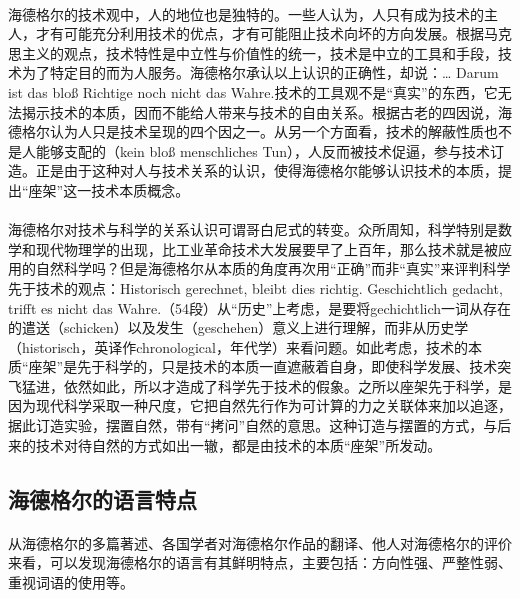 \documentclass{article}
\begin{document}
		\paragraph{}
海德格尔的技术观中，人的地位也是独特的。一些人认为，人只有成为技术的主人，才有可能充分利用技术的优点，才有可能阻止技术向坏的方向发展。根据马克思主义的观点，技术特性是中立性与价值性的统一，技术是中立的工具和手段，技术为了特定目的而为人服务。海德格尔承认以上认识的正确性，却说：… Darum ist das bloß Richtige noch nicht das Wahre.技术的工具观不是“真实”的东西，它无法揭示技术的本质，因而不能给人带来与技术的自由关系。根据古老的四因说，海德格尔认为人只是技术呈现的四个因之一。从另一个方面看，技术的解蔽性质也不是人能够支配的（kein bloß menschliches Tun），人反而被技术促逼，参与技术订造。正是由于这种对人与技术关系的认识，使得海德格尔能够认识技术的本质，提出“座架”这一技术本质概念。
		\paragraph{}
海德格尔对技术与科学的关系认识可谓哥白尼式的转变。众所周知，科学特别是数学和现代物理学的出现，比工业革命技术大发展要早了上百年，那么技术就是被应用的自然科学吗？但是海德格尔从本质的角度再次用“正确”而非“真实”来评判科学先于技术的观点：Historisch gerechnet, bleibt dies richtig. Geschichtlich gedacht, trifft es nicht das Wahre.（54段）从“历史”上考虑，是要将gechichtlich一词从存在的遣送（schicken）以及发生（geschehen）意义上进行理解，而非从历史学（historisch，英译作chronological，年代学）来看问题。如此考虑，技术的本质“座架”是先于科学的，只是技术的本质一直遮蔽着自身，即使科学发展、技术突飞猛进，依然如此，所以才造成了科学先于技术的假象。之所以座架先于科学，是因为现代科学采取一种尺度，它把自然先行作为可计算的力之关联体来加以追逐，据此订造实验，摆置自然，带有“拷问”自然的意思。这种订造与摆置的方式，与后来的技术对待自然的方式如出一辙，都是由技术的本质“座架”所发动。

	\subsection{海德格尔的语言特点}
		\paragraph{}
		从海德格尔的多篇著述、各国学者对海德格尔作品的翻译、他人对海德格尔的评价来看，可以发现海德格尔的语言有其鲜明特点，主要包括：方向性强、严整性弱、重视词语的使用等。
\end{document}
